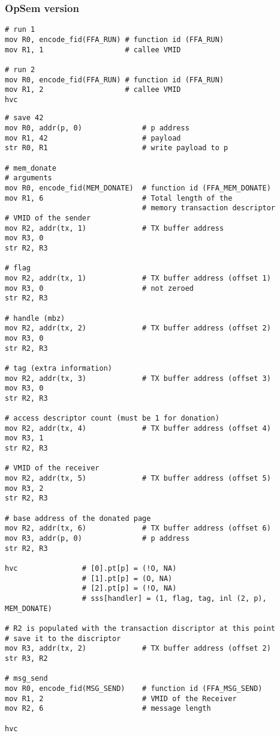 \documentclass{article}
\begin{document}
\subsubsection{OpSem version}

\begin{lstlisting}[caption={VM 0}]
# run 1
mov R0, encode_fid(FFA_RUN) # function id (FFA_RUN)
mov R1, 1                   # callee VMID

# run 2
mov R0, encode_fid(FFA_RUN) # function id (FFA_RUN)
mov R1, 2                   # callee VMID
hvc
\end{lstlisting}

\begin{lstlisting}[caption={VM 1}]
# save 42
mov R0, addr(p, 0)              # p address
mov R1, 42                      # payload
str R0, R1                      # write payload to p

# mem_donate
# arguments
mov R0, encode_fid(MEM_DONATE)  # function id (FFA_MEM_DONATE)
mov R1, 6                       # Total length of the  
                                # memory transaction descriptor
# VMID of the sender 
mov R2, addr(tx, 1)             # TX buffer address                               
mov R3, 0
str R2, R3

# flag
mov R2, addr(tx, 1)             # TX buffer address (offset 1)                               
mov R3, 0                       # not zeroed
str R2, R3

# handle (mbz)
mov R2, addr(tx, 2)             # TX buffer address (offset 2)
mov R3, 0
str R2, R3

# tag (extra information)
mov R2, addr(tx, 3)             # TX buffer address (offset 3)
mov R3, 0
str R2, R3

# access descriptor count (must be 1 for donation)
mov R2, addr(tx, 4)             # TX buffer address (offset 4)
mov R3, 1
str R2, R3

# VMID of the receiver
mov R2, addr(tx, 5)             # TX buffer address (offset 5)
mov R3, 2
str R2, R3

# base address of the donated page
mov R2, addr(tx, 6)             # TX buffer address (offset 6)
mov R3, addr(p, 0)              # p address
str R2, R3

hvc               # [0].pt[p] = (!O, NA)
                  # [1].pt[p] = (O, NA)
                  # [2].pt[p] = (!O, NA)
                  # sss[handler] = (1, flag, tag, inl (2, p), MEM_DONATE)

# R2 is populated with the transaction discriptor at this point
# save it to the discriptor
mov R3, addr(tx, 2)             # TX buffer address (offset 2)
str R3, R2

# msg_send
mov R0, encode_fid(MSG_SEND)    # function id (FFA_MSG_SEND)
mov R1, 2                       # VMID of the Receiver
mov R2, 6                       # message length

hvc
\end{lstlisting}
\end{document}
